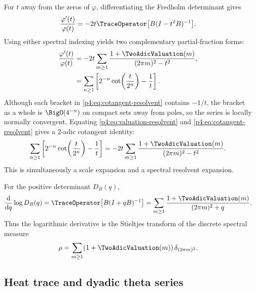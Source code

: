 \documentclass[11pt]{article}
\theoremstyle{definition}
\theoremstyle{remark}
\newcommand{\phiF}{\varphi}
\begin{document}
For \(t\) away from the zeros of \(\phiF\), differentiating the Fredholm determinant
gives
\begin{equation}
 \frac{\phiF'(t)}{\phiF(t)}
 =-2t\TraceOperator\bigl[B(I-t^2B)^{-1}\bigr].
 \label{p4:eq:resolvent-logderivative}
\end{equation}
Using either spectral indexing yields two complementary partial-fraction forms:
\begin{align}
 \frac{\phiF'(t)}{\phiF(t)}
 &=-2t\sum_{m\ge1}\frac{1+\TwoAdicValuation(m)}{(2\pi m)^2-t^2},
 \label{p4:eq:valuation-resolvent}\\
 &=\sum_{n\ge1}
 \left[2^{-n}\cot\!\left(\frac{t}{2^n}\right)-\frac1t\right].
 \label{p4:eq:cotangent-resolvent}
\end{align}
Although each bracket in \eqref{p4:eq:cotangent-resolvent} contains \(-1/t\), the bracket
as a whole is \(\BigO(4^{-n})\) on compact sets away from poles, so the series is
locally normally convergent.  Equating \eqref{p4:eq:valuation-resolvent} and
\eqref{p4:eq:cotangent-resolvent} gives a 2-adic cotangent identity:
\begin{equation}
 \sum_{n\ge1}
 \left[2^{-n}\cot\!\left(\frac{t}{2^n}\right)-\frac1t\right]
 =-2t\sum_{m\ge1}\frac{1+\TwoAdicValuation(m)}{(2\pi m)^2-t^2}.
 \label{p4:eq:cot-valuation-identity}
\end{equation}
This is simultaneously a scale expansion and a spectral resolvent expansion.

For the positive determinant \(D_B(q)\),
\begin{equation}
 \frac{\mathrm d}{\mathrm dq}\log D_B(q)
 =\TraceOperator\bigl[B(I+qB)^{-1}\bigr]
 =\sum_{m\ge1}\frac{1+\TwoAdicValuation(m)}{(2\pi m)^2+q}.
 \label{p4:eq:Stieltjes-resolvent}
\end{equation}
Thus the logarithmic derivative is the Stieltjes transform of the discrete spectral
measure
\begin{equation}
 \rho=\sum_{m\ge1}(1+\TwoAdicValuation(m))\,\delta_{(2\pi m)^2}.
 \label{p4:eq:spectral-measure}
\end{equation}

\subsection{Heat trace and dyadic theta series}
\end{document}
